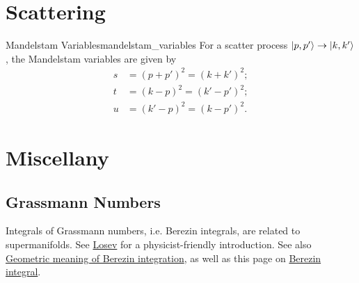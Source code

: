 \documentclass{article}
\begin{document}
\section{Scattering}

\begin{definition}{Mandelstam Variables}{mandelstam_variables}
    For a scatter process $\ket{p,p'}\rightarrow \ket{k,k'}$, the Mandelstam variables are given by
    \begin{align*}
        s &= (p+p')^2 = (k+k')^2; \\
        t &= (k-p)^2 = (k'-p')^2; \\
        u &= (k'-p)^2 = (k-p')^2.
    \end{align*}
\end{definition}

\section{Miscellany}

\subsection{Grassmann Numbers}

Integrals of Grassmann numbers, i.e. Berezin integrals, are related to supermanifolds.
See \href{ref/Losev-Berezin-Integral.pdf}{Losev} for a physicist-friendly introduction.
See also \href{https://math.stackexchange.com/questions/1449312/geometric-meaning-of-berezin-integration}{Geometric meaning of Berezin integration},
as well as this page on \href{https://ncatlab.org/nlab/show/Berezin+integral}{Berezin integral}.



\end{document}

